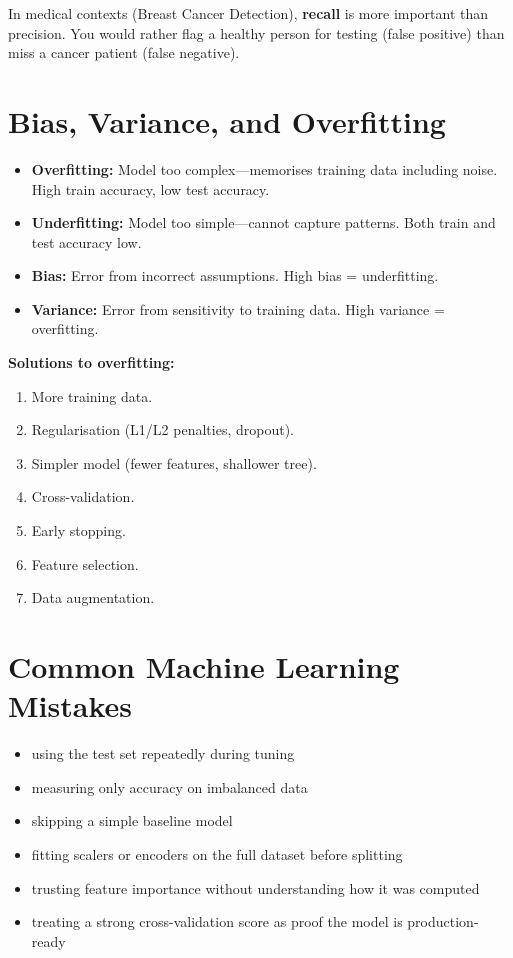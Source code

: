 \documentclass[12pt, a4paper, oneside]{book}
\begin{document}
\begin{warningbox}
In medical contexts (Breast Cancer Detection), \textbf{recall} is more important than precision. You would rather flag a healthy person for testing (false positive) than miss a cancer patient (false negative).
\end{warningbox}

\section{Bias, Variance, and Overfitting}

\begin{itemize}[leftmargin=2em]
    \item \textbf{Overfitting:} Model too complex---memorises training data including noise. High train accuracy, low test accuracy.
    \item \textbf{Underfitting:} Model too simple---cannot capture patterns. Both train and test accuracy low.
    \item \textbf{Bias:} Error from incorrect assumptions. High bias = underfitting.
    \item \textbf{Variance:} Error from sensitivity to training data. High variance = overfitting.
\end{itemize}

\textbf{Solutions to overfitting:}
\begin{enumerate}[leftmargin=2em]
    \item More training data.
    \item Regularisation (L1/L2 penalties, dropout).
    \item Simpler model (fewer features, shallower tree).
    \item Cross-validation.
    \item Early stopping.
    \item Feature selection.
    \item Data augmentation.
\end{enumerate}

\section{Common Machine Learning Mistakes}

\begin{itemize}[leftmargin=2em]
    \item using the test set repeatedly during tuning
    \item measuring only accuracy on imbalanced data
    \item skipping a simple baseline model
    \item fitting scalers or encoders on the full dataset before splitting
    \item trusting feature importance without understanding how it was computed
    \item treating a strong cross-validation score as proof the model is production-ready
\end{itemize}
\end{document}
